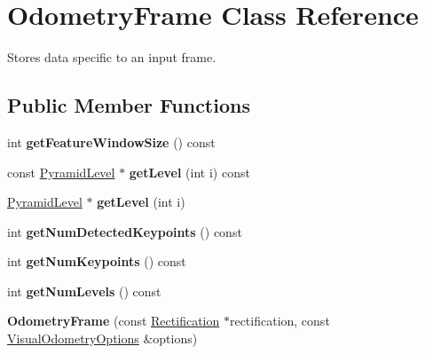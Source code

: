 \hypertarget{classfovis_1_1OdometryFrame}{
\section{OdometryFrame Class Reference}
\label{classfovis_1_1OdometryFrame}
}


Stores data specific to an input frame.  


\subsection*{Public Member Functions}
\begin{DoxyCompactItemize}
\item 
\hypertarget{classfovis_1_1OdometryFrame_ad863915a3ff363865748cb880ead406c}{
int {\bfseries getFeatureWindowSize} () const }
\label{classfovis_1_1OdometryFrame_ad863915a3ff363865748cb880ead406c}

\item 
\hypertarget{classfovis_1_1OdometryFrame_af940532ad78bdfc5b747bdee6235c932}{
const \hyperlink{classfovis_1_1PyramidLevel}{PyramidLevel} $\ast$ {\bfseries getLevel} (int i) const }
\label{classfovis_1_1OdometryFrame_af940532ad78bdfc5b747bdee6235c932}

\item 
\hypertarget{classfovis_1_1OdometryFrame_af0db382022a6a1e6e24c88fa2f7cfdd6}{
\hyperlink{classfovis_1_1PyramidLevel}{PyramidLevel} $\ast$ {\bfseries getLevel} (int i)}
\label{classfovis_1_1OdometryFrame_af0db382022a6a1e6e24c88fa2f7cfdd6}

\item 
\hypertarget{classfovis_1_1OdometryFrame_a6b34494d5f8a1666d216bae16f25640b}{
int {\bfseries getNumDetectedKeypoints} () const }
\label{classfovis_1_1OdometryFrame_a6b34494d5f8a1666d216bae16f25640b}

\item 
\hypertarget{classfovis_1_1OdometryFrame_ac411e38b8e5d28686355d6e7afece27f}{
int {\bfseries getNumKeypoints} () const }
\label{classfovis_1_1OdometryFrame_ac411e38b8e5d28686355d6e7afece27f}

\item 
\hypertarget{classfovis_1_1OdometryFrame_a3968e8ed365b6f380fd1fb8bdb2f3b81}{
int {\bfseries getNumLevels} () const }
\label{classfovis_1_1OdometryFrame_a3968e8ed365b6f380fd1fb8bdb2f3b81}

\item 
\hypertarget{classfovis_1_1OdometryFrame_afb94538eb0c8c699d42f3ef1515e45ca}{
{\bfseries OdometryFrame} (const \hyperlink{classfovis_1_1Rectification}{Rectification} $\ast$rectification, const \hyperlink{group__FovisCore_ga113578b67d3e37bc78f1fffd8440e1ff}{VisualOdometryOptions} \&options)}
\label{classfovis_1_1OdometryFrame_afb94538eb0c8c699d42f3ef1515e45ca}


\end{DoxyCompactItemize}
